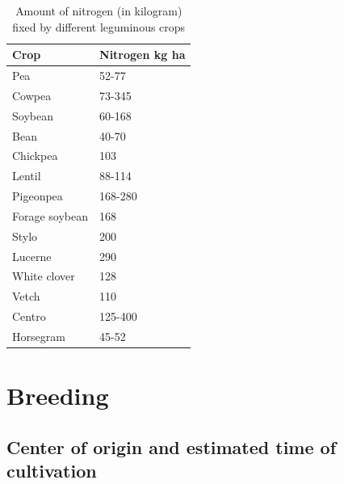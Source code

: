 \documentclass[
  openany]{book}
\begin{document}
\begin{longtable}[t]{ll}
\caption{\label{tab:biological-nitrogen-fixation}Amount of nitrogen (in kilogram) fixed by different leguminous crops}\\
\toprule
Crop & Nitrogen kg ha\\
\midrule
\rowcolor{gray!6}  Pea & 52-77\\
Cowpea & 73-345\\
\rowcolor{gray!6}  Soybean & 60-168\\
Bean & 40-70\\
\rowcolor{gray!6}  Chickpea & 103\\
\addlinespace
Lentil & 88-114\\
\rowcolor{gray!6}  Pigeonpea & 168-280\\
Forage soybean & 168\\
\rowcolor{gray!6}  Stylo & 200\\
Lucerne & 290\\
\addlinespace
\rowcolor{gray!6}  White clover & 128\\
Vetch & 110\\
\rowcolor{gray!6}  Centro & 125-400\\
Horsegram & 45-52\\
\bottomrule
\end{longtable}

\hypertarget{breeding}{%
\chapter{Breeding}\label{breeding}}

\hypertarget{center-of-origin-and-estimated-time-of-cultivation}{%
\section{Center of origin and estimated time of cultivation}\label{center-of-origin-and-estimated-time-of-cultivation}}
\end{document}
